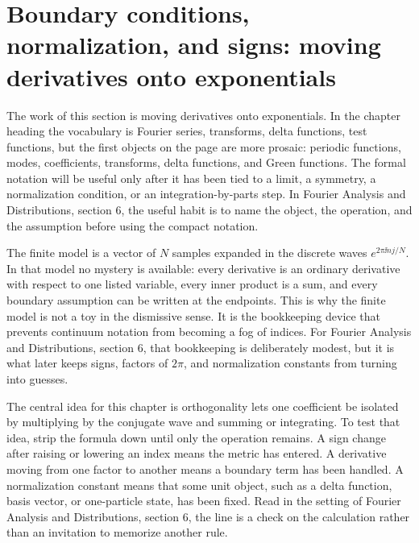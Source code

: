 \section{Boundary conditions, normalization, and signs: moving derivatives onto exponentials}













The work of this section is moving derivatives onto exponentials.  In the chapter heading the vocabulary is Fourier series, transforms, delta functions, test functions, but the first objects on the page are more prosaic: periodic functions, modes, coefficients, transforms, delta functions, and Green functions.  The formal notation will be useful only after it has been tied to a limit, a symmetry, a normalization condition, or an integration-by-parts step.  In Fourier Analysis and Distributions, section 6, the useful habit is to name the object, the operation, and the assumption before using the compact notation.

The finite model is a vector of \(N\) samples expanded in the discrete waves \(e^{2\pi \ii nj/N}\).  In that model no mystery is available: every derivative is an ordinary derivative with respect to one listed variable, every inner product is a sum, and every boundary assumption can be written at the endpoints.  This is why the finite model is not a toy in the dismissive sense.  It is the bookkeeping device that prevents continuum notation from becoming a fog of indices.  For Fourier Analysis and Distributions, section 6, that bookkeeping is deliberately modest, but it is what later keeps signs, factors of \(2\pi\), and normalization constants from turning into guesses.

The central idea for this chapter is orthogonality lets one coefficient be isolated by multiplying by the conjugate wave and summing or integrating.  To test that idea, strip the formula down until only the operation remains.  A sign change after raising or lowering an index means the metric has entered.  A derivative moving from one factor to another means a boundary term has been handled.  A normalization constant means that some unit object, such as a delta function, basis vector, or one-particle state, has been fixed.  Read in the setting of Fourier Analysis and Distributions, section 6, the line is a check on the calculation rather than an invitation to memorize another rule.

